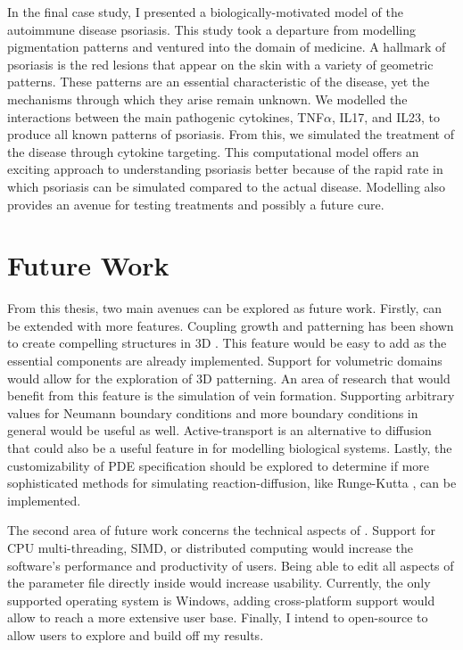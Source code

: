 In the final case study, I presented a biologically-motivated model of the autoimmune disease psoriasis. This study took a departure from modelling pigmentation patterns and ventured into the domain of medicine. A hallmark of psoriasis is the red lesions that appear on the skin with a variety of geometric patterns. These patterns are an essential characteristic of the disease, yet the mechanisms through which they arise remain unknown. We modelled the interactions between the main pathogenic cytokines, TNF$\alpha$, IL17, and IL23, to produce all known patterns of psoriasis. From this, we simulated the treatment of the disease through cytokine targeting. This computational model offers an exciting approach to understanding psoriasis better because of the rapid rate in which psoriasis can be simulated compared to the actual disease. Modelling also provides an avenue for testing treatments and possibly a future cure.

\section{Future Work}
From this thesis, two main avenues can be explored as future work. Firstly, \ProgramName{} can be extended with more features. Coupling growth and patterning has been shown to create compelling structures in 3D \cite{harrison2002, holloway2007}. This feature would be easy to add as the essential components are already implemented. Support for volumetric domains would allow for the exploration of 3D patterning. An area of research that would benefit from this feature is the simulation of vein formation. Supporting arbitrary values for Neumann boundary conditions and more boundary conditions in general would be useful as well. Active-transport is an alternative to diffusion that could also be a useful feature in \ProgramName{} for modelling biological systems. Lastly, the customizability of PDE specification should be explored to determine if more sophisticated methods for simulating reaction-diffusion, like Runge-Kutta \citep{marschner2015}, can be implemented. 

The second area of future work concerns the technical aspects of \ProgramName{}. Support for CPU multi-threading, SIMD, or distributed computing would increase the software's performance and productivity of users. Being able to edit all aspects of the parameter file directly inside \ProgramName{} would increase usability. Currently, the only supported operating system is Windows, adding cross-platform support would allow \ProgramName{} to reach a more extensive user base. Finally, I intend to open-source \ProgramName{} to allow users to explore and build off my results.